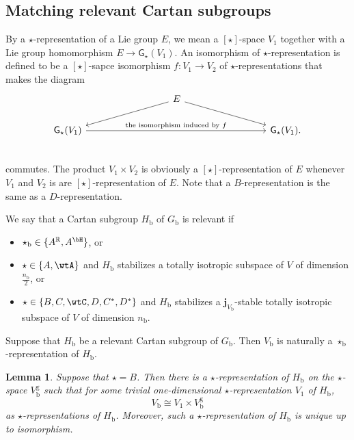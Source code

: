 \documentclass[12pt,a4paper]{amsart}
\newcommand{\R}{\mathbb R}
\numberwithin{equation}{section}
\newtheorem{lem}[thm]{Lemma}
\theoremstyle{remark}
\begin{document}
\subsection{Matching relevant Cartan subgroups}




By a $\star$-representation of a Lie group $E$, we mean a $[\star]$-space $V_1$ together with a Lie group homomorphism $E\rightarrow \mathsf G_\star(V_1)$. An isomorphism of $\star$-representation is defined to be a $[\star]$-sapce  isomorphism $f: V_1\rightarrow V_2$ of  $\star$-representations that makes the diagram
\[
\begin{tikzcd}[column sep={4cm,between origins}]
      & E
      \ar[dl," "']\ar[dr,"  "]&\\
      \mathsf G_\star(V_1)\ar[rr,"\textrm{the isomorphism induced by $f$}"]& &\mathsf G_\star(V_1).\\
    \end{tikzcd}
\]
commutes. The product $V_1\times V_2$ is obviously a $[\star]$-representation of $E$ whenever $V_1$ and $ V_2$ is are $[\star]$-representation of $E$.
Note that a $B$-representation is the same as a $D$-representation.

We say that a Cartan subgroup $H_\mathrm b$ of $G_\mathrm b$ is relevant if
\begin{itemize}
\item
$\star_\mathrm b\in \{A^\R, A^\bH\}$, or
\item $\star\in \{A, \wtA\}$ and $H_\mathrm b$ stabilizes a totally isotropic subspace of $V$ of dimension $\frac{n_\mathrm b}{2}$, or
\item
 $\star\in \{B,C,\wtC, D, C^*, D^*\}$ and $H_\mathrm b$ stabilizes  a $\mathbf j_{V_\mathrm b}$-stable totally isotropic subspace of $V$ of dimension $n_\mathrm b$.
\end{itemize}

Suppose that
 $H_\mathrm b$ be a relevant Cartan subgroup of $G_\mathrm b$. Then $V_\mathrm b$ is naturally a $\star_\mathrm b$-representation of $H_\mathrm b$.

 \begin{lem}\label{match1}
Suppose that $\star=B$. Then  there is a $\star$-representation of $H_\mathrm b$  on the $\star$-space $V_\mathrm b^\mathrm g$ such that for some trivial one-dimensional $\star$-representation $V_1$ of $H_\mathrm b$,
\[
  V_\mathrm b\cong V_1\times V_\mathrm b^\mathrm g
\]
as $\star$-representations of $H_\mathrm b$. Moreover, such a $\star$-representation of $H_\mathrm b$ is unique up to isomorphism.

 \end{lem}
\end{document}
